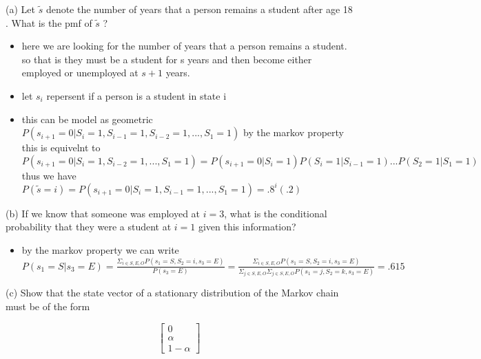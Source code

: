 \documentclass[10pt]{article}
\begin{document}
(a) Let $\tilde{s}$ denote the number of years that a person remains a student after age 18 . What is the pmf of $\tilde{s}$ ?
\begin{itemize}
    \item here we are looking for the number of years that a person remains a student. so that is they must be a student for s years and then become either employed or unemployed at $s+1$ years.
    \item let $s_i$ repersent if a person is a student in state i
    \item this can be model as geometric $P(s_{i+1}=0|S_{i}=1,S_{i-1}=1,S_{i-2}=1,...,S_{1}=1)$ by the markov property this is equivelnt to $P(s_{i+1}=0|S_{i}=1,S_{i-2}=1,...,S_{1}=1)=P(s_{i+1}=0|S_{i}=1)P(S_{i}=1|S_{i-1}=1)...P(S_{2}=1|S_{1}=1)$
    thus we have $P(\tilde{s}=i)=P(s_{i+1}=0|S_{i}=1,S_{i-1}=1,...,S_{1}=1)=.8^{i}(.2)$
\end{itemize}

(b) If we know that someone was employed at $i=3$, what is the conditional probability that they were a student at $i=1$ given this information?
\begin{itemize}
    \item by the markov property we can write $P(s_1=S|s_3=E)=\frac{\Sigma_{i\in S,E,O}P(s_1=S,S_2=i,s_3=E)}{P(s_3=E)}=\frac{\Sigma_{i\in S,E,O}P(s_1=S,S_2=i,s_3=E)}{\Sigma_{j\in S,E,O}\Sigma_{j\in S,E,O}P(s_1=j,S_2=k,s_3=E)}=.615$
\end{itemize}

(c) Show that the state vector of a stationary distribution of the Markov chain must be of the form

$$
\left[\begin{array}{c}
0 \\
\alpha \\
1-\alpha
\end{array}\right]
$$
\end{document}
